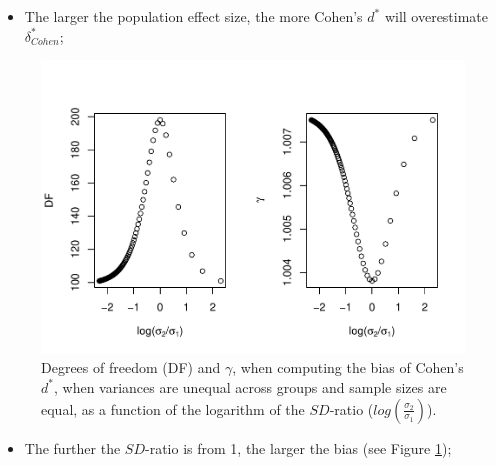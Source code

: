 \documentclass[
  english,
  man,mask]{apa6}
\providecommand{\tightlist}{%
  \setlength{\itemsep}{0pt}\setlength{\parskip}{0pt}}
\begin{document}
\begin{itemize}
\tightlist
\item
  The larger the population effect size, the more Cohen's \(d^*\) will overestimate \(\delta^*_{Cohen}\);
\end{itemize}

\begin{figure}
\centering
\includegraphics{Theoretical-Bias-of-all-estimators-as-a-function-of-population-parameters_files/figure-latex/biascohendprimehetbalSDratio2-1.pdf}
\caption{\label{fig:biascohendprimehetbalSDratio2}Degrees of freedom (DF) and \(\gamma\), when computing the bias of Cohen's \(d^*\), when variances are unequal across groups and sample sizes are equal, as a function of the logarithm of the \(SD\)-ratio (\(log \left( \frac{\sigma_2}{\sigma_1} \right)\)).}
\end{figure}

\begin{itemize}
\tightlist
\item
  The further the \(SD\)-ratio is from 1, the larger the bias (see Figure \ref{fig:biascohendprimehetbalSDratio2});
\end{itemize}
\end{document}
